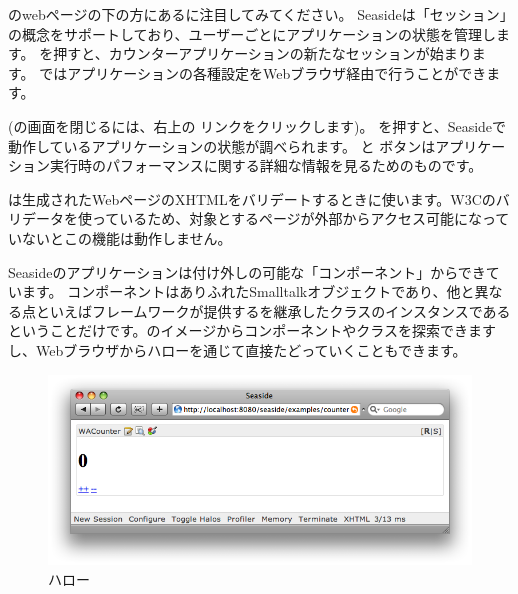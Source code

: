 \documentclass[a4paper,10pt,twoside]{book}
\begin{document}
のwebページの下の方にあるに注目してみてください。
Seasideは「セッション」の概念をサポートしており、ユーザーごとにアプリケーションの状態を管理します。
 を押すと、カウンターアプリケーションの新たなセッションが始まります。
 ではアプリケーションの各種設定をWebブラウザ経由で行うことができます。

(の画面を閉じるには、右上の  リンクをクリックします)。
 を押すと、Seasideで動作しているアプリケーションの状態が調べられます。
 と  ボタンはアプリケーション実行時のパフォーマンスに関する詳細な情報を見るためのものです。

 は生成されたWebページのXHTMLをバリデートするときに使います。W3Cのバリデータを使っているため、対象とするページが外部からアクセス可能になっていないとこの機能は動作しません。

Seasideのアプリケーションは付け外しの可能な「コンポーネント」からできています。
コンポーネントはありふれたSmalltalkオブジェクトであり、他と異なる点といえばフレームワークが提供するを継承したクラスのインスタンスであるということだけです。\pharo のイメージからコンポーネントやクラスを探索できますし、Webブラウザからハローを通じて直接たどっていくこともできます。

\begin{figure}[ht]
\begin{center}
\includegraphics[width=\textwidth]{counterHalos}
\caption{ハロー}
\end{center}
\end{figure}

\end{document}
